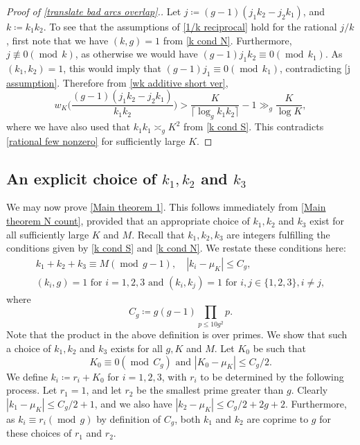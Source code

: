 \documentclass[hidelinks,11pt,reqno]{amsart}
\renewcommand{\leq}{\leqslant}
\newcommand{\nequiv}{\not\equiv}
\theoremstyle{remark}
\newcommand{\md}[1]{\ensuremath{(\operatorname{mod}\, #1)}}
\begin{document}
\begin{proof}[Proof of \cref{translate bad arcs overlap}.]
Let $j\coloneq (g-1)(j_{1}k_{2}-j_{2}k_{1})$, and $k\coloneq k_{1}k_{2}$. To see that the assumptions of \cref{1/k reciprocal} hold for the rational $j/k$, first note that we have $(k,g)=1$ from \cref{k cond N}. Furthermore, $j\nequiv 0 \md{k}$, as otherwise we would have $(g-1)j_{1}k_{2}\equiv 0\md{k_{1}}$. As $(k_{1},k_{2})=1$, this would imply that $(g-1)j_{1}\equiv 0\md{k_{1}}$, contradicting \cref{j assumption}. Therefore from \cref{wk additive short ver},
\begin{equation*}
    w_{K}\Big (\frac{(g-1)(j_{1}k_{2}-j_{2}k_{1})}{k_{1}k_{2}}\Big )> \frac{K}{\lceil \log_{g}k_{1}k_{2}\rceil}-1\gg_{g}\frac{K}{\log K},
\end{equation*}
where we have also used that $k_{1}k_{1}\asymp_{g} K^{2}$ from \cref{k cond S}. This contradicts \cref{rational few nonzero} for sufficiently large $K$.
\end{proof} 

\subsection{An explicit choice of $k_{1}, k_{2}$ and $k_{3}$}\label{section k choice}
We may now prove \cref{Main theorem 1}. This follows immediately from \cref{Main theorem N count}, provided that an appropriate choice of $k_{1},k_{2}$ and $k_{3}$ exist for all sufficiently large $K$ and $M$. Recall that $k_{1},k_{2},k_{3}$ are integers fulfilling the conditions given by \cref{k cond S} and \cref{k cond N}. We restate these conditions here:
\begin{gather*}
    k_{1}+k_{2}+k_{3}\equiv M \md{g-1}, \hspace{1em} |k_{i}-\mu_{K}|\leq C_{g}, \nonumber\\
    (k_{i},g)=1 \textrm{ for }i=1,2,3 \textrm{ and }(k_{i},k_{j})=1 \textrm{ for }i,j\in \{1,2,3\} ,i\neq j,
\end{gather*}
where \[C_{g}\coloneq g(g-1)\prod_{p\leq 10g^{2}}p.\] Note that the product in the above definition is over primes. We show that such a choice of $k_{1},k_{2}$ and $k_{3}$ exists for all $g,K$ and $M$.  Let $K_{0}$ be such that 
\begin{equation}\label{K0 choice }K_{0}\equiv 0\md{C_{g}}\textrm{ and }|K_{0}-\mu_{K}|\leq C_{g}/2.\end{equation}
We define $k_{i}\coloneq r_{i}+K_{0}$ for $i=1,2,3$, with $r_{i}$ to be determined by the following process. Let $r_{1}=1$, and let $r_{2}$ be the smallest prime greater than $g$. Clearly $|k_{1}-\mu_{K}|\leq C_{g}/2+1$, and we also have $|k_{2}-\mu_{K}|\leq C_{g}/2+2g+2$. Furthermore, as $k_{i}\equiv r_{i}\md{g}$ by definition of $C_{g}$, both $k_{1}$ and $k_{2}$ are coprime to $g$ for these choices of $r_{1}$ and $r_{2}$. 
\end{document}
